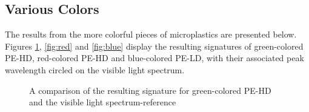 \subsection{Various Colors}
The results from the more colorful pieces of microplastics are presented below. Figures \ref{fig:green}, \ref{fig:red} and \ref{fig:blue} display the resulting signatures of green-colored PE-HD, red-colored PE-HD and blue-colored PE-LD, with their associated peak wavelength circled on the visible light spectrum.  
\begin{figure}[H]
  \newcommand*\FigVSkip{0.5em}
  \newcommand*\FigHSkip{0.1em}
  \newsavebox\FigBox
  \centering
  \begin{minipage}{\wd\FigBox}
    \centering\usebox{\FigBox}
  \end{minipage}
  \begin{minipage}{\wd\FigBox}
    \centering\usebox{\FigBox}
  \end{minipage}
  \caption[Comparing Green PE-HD with Visible Light Spectrum]{A comparison of the resulting signature for green-colored PE-HD and the visible light spectrum-reference}
  \label{fig:green}
\end{figure}


